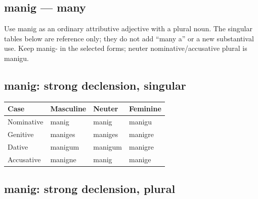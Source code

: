 \subsection*{manig — many}

Use manig as an ordinary attributive adjective with a plural noun. The singular tables below are reference only; they do not add “many a” or a new substantival use. Keep manig- in the selected forms; neuter nominative/\allowbreak{}accusative plural is manigu.

\subsection*{manig: strong declension, singular}

\par\begingroup
\fontsize{10.5}{13.2}\selectfont
\setlength{\LTleft}{0pt}\setlength{\LTright}{\fill}
\noindent
\begin{tabular}{@{}>{\raggedright\arraybackslash}p{28.89mm}>{\raggedright\arraybackslash}p{28.89mm}>{\raggedright\arraybackslash}p{28.89mm}>{\raggedright\arraybackslash}p{28.89mm}@{}}
\toprule
\textbf{Case} & \textbf{Masculine} & \textbf{Neuter} & \textbf{Feminine} \\
\midrule
Nominative & manig & manig & manigu \\
Genitive & maniges & maniges & manigre \\
Dative & manigum & manigum & manigre \\
Accusative & manigne & manig & manige \\
\bottomrule
\end{tabular}
\par\endgroup

\subsection*{manig: strong declension, plural}

